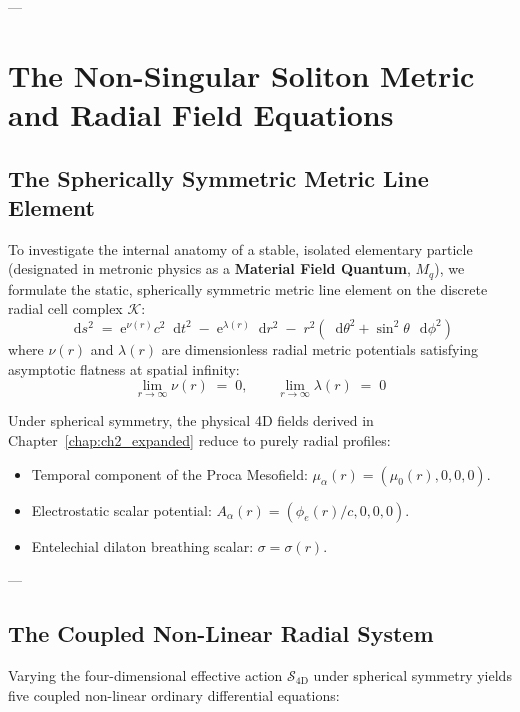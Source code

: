 \documentclass[
    12pt,
    a4paper,
    headings=normal,
    twoside=false,
    open=any,
    parskip=half
]{scrbook}
\newcommand{\diff}{\mathop{}\!\mathrm{d}}
\newcommand{\eu}{\mathrm{e}}
\begin{document}
---

\section{The Non-Singular Soliton Metric and Radial Field Equations}
\label{sec:ch3_spherical_radial_system}

\subsection{The Spherically Symmetric Metric Line Element}

To investigate the internal anatomy of a stable, isolated elementary particle (designated in metronic physics as a \textbf{Material Field Quantum}, $M_q$), we formulate the static, spherically symmetric metric line element on the discrete radial cell complex $\mathcal{K}$:
\begin{equation}
\diff s^2 \;=\; \eu^{\nu(r)} c^2 \diff t^2 \;-\; \eu^{\lambda(r)} \diff r^2 \;-\; r^2 \left( \diff\theta^2 + \sin^2\theta \, \diff\phi^2 \right)
\label{eq:ch3_spherical_line_element}
\end{equation}
where $\nu(r)$ and $\lambda(r)$ are dimensionless radial metric potentials satisfying asymptotic flatness at spatial infinity:
\begin{equation}
\lim_{r \to \infty} \nu(r) \;=\; 0, \qquad \lim_{r \to \infty} \lambda(r) \;=\; 0
\label{eq:ch3_asymptotic_flatness}
\end{equation}

Under spherical symmetry, the physical 4D fields derived in Chapter~\ref{chap:ch2_expanded} reduce to purely radial profiles:
\begin{itemize}[leftmargin=1.8em]
    \item Temporal component of the Proca Mesofield: $\mu_\alpha(r) = (\mu_0(r), 0, 0, 0)$.
    \item Electrostatic scalar potential: $A_\alpha(r) = (\phi_e(r)/c, 0, 0, 0)$.
    \item Entelechial dilaton breathing scalar: $\sigma = \sigma(r)$.
\end{itemize}

---

\subsection{The Coupled Non-Linear Radial System}

Varying the four-dimensional effective action $\mathcal{S}_{4\text{D}}$ under spherical symmetry yields five coupled non-linear ordinary differential equations:
\end{document}
